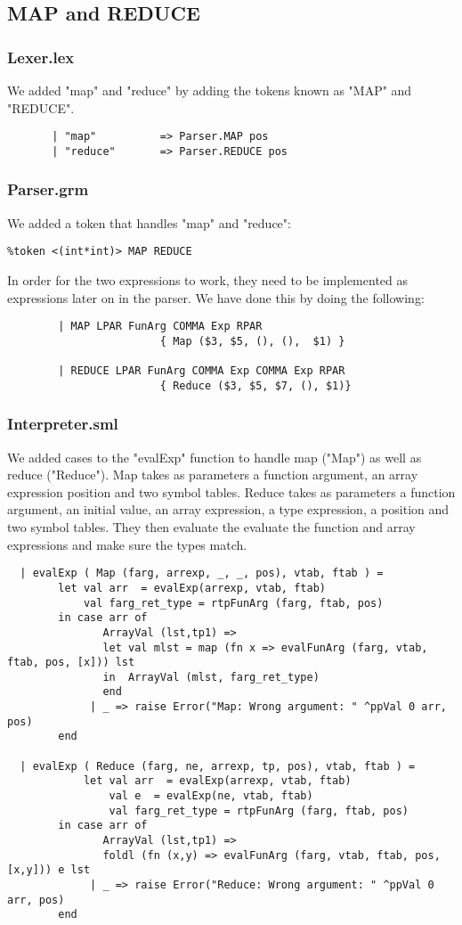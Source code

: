 \documentclass[12pt]{article}
\begin{document}
\subsection{MAP and REDUCE}
\subsubsection{Lexer.lex}
We added "map" and "reduce" by adding the tokens known as "MAP" and "REDUCE".
\begin{verbatim}
       | "map"          => Parser.MAP pos
       | "reduce"       => Parser.REDUCE pos
\end{verbatim}
\subsubsection{Parser.grm}
We added a token that handles "map" and "reduce":
\begin{verbatim}
%token <(int*int)> MAP REDUCE
\end{verbatim}
In order for the two expressions to work, they need to be implemented as expressions later on in the parser. We have done this by doing the following:
\begin{verbatim}
        | MAP LPAR FunArg COMMA Exp RPAR
                        { Map ($3, $5, (), (),  $1) }

        | REDUCE LPAR FunArg COMMA Exp COMMA Exp RPAR
                        { Reduce ($3, $5, $7, (), $1)}
\end{verbatim}
\subsubsection{Interpreter.sml}
We added cases to the "evalExp" function to handle map ("Map") as well as reduce ("Reduce"). Map takes as parameters a function argument, an array expression position and two symbol tables. Reduce takes as parameters a function argument, an initial value, an array expression, a type expression, a position and two symbol tables. They then evaluate the evaluate the function and array expressions and make sure the types match.
\begin{verbatim}
  | evalExp ( Map (farg, arrexp, _, _, pos), vtab, ftab ) =
        let val arr  = evalExp(arrexp, vtab, ftab)
            val farg_ret_type = rtpFunArg (farg, ftab, pos)
        in case arr of
               ArrayVal (lst,tp1) =>
               let val mlst = map (fn x => evalFunArg (farg, vtab, ftab, pos, [x])) lst
               in  ArrayVal (mlst, farg_ret_type)
               end
             | _ => raise Error("Map: Wrong argument: " ^ppVal 0 arr, pos)
        end

  | evalExp ( Reduce (farg, ne, arrexp, tp, pos), vtab, ftab ) =
            let val arr  = evalExp(arrexp, vtab, ftab)
                val e  = evalExp(ne, vtab, ftab)
                val farg_ret_type = rtpFunArg (farg, ftab, pos)
        in case arr of
               ArrayVal (lst,tp1) =>
               foldl (fn (x,y) => evalFunArg (farg, vtab, ftab, pos, [x,y])) e lst
             | _ => raise Error("Reduce: Wrong argument: " ^ppVal 0 arr, pos)
        end
\end{verbatim}
\end{document}
